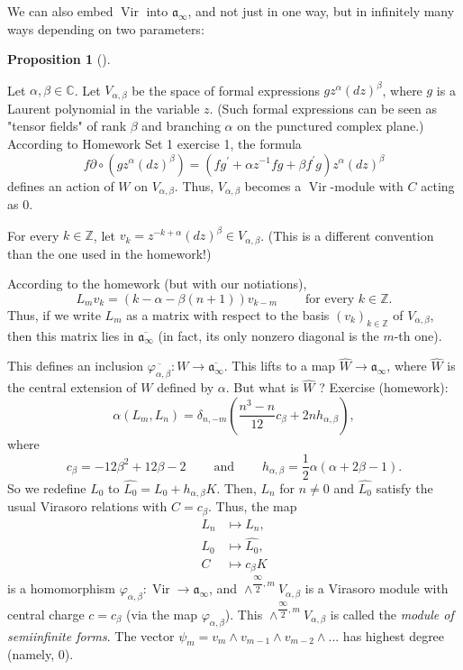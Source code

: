 \documentclass
[numbers=enddot,12pt,final,onecolumn,german,notitlepage]{scrartcl}%
\theoremstyle{definition}
\newtheorem{prop}[theo]{Proposition}
\newenvironment{proposition}[1][]
{\begin{prop}[#1]\begin{leftbar}}
{\end{leftbar}\end{prop}}
\begin{document}
We can also embed $\operatorname*{Vir}$ into $\mathfrak{a}_{\infty}$, and not
just in one way, but in infinitely many ways depending on two parameters:

\begin{proposition}
Let $\alpha,\beta\in\mathbb{C}$. Let $V_{\alpha,\beta}$ be the space of formal
expressions $gz^{\alpha}\left(  dz\right)  ^{\beta}$, where $g$ is a Laurent
polynomial in the variable $z$. (Such formal expressions can be seen as
"tensor fields" of rank $\beta$ and branching $\alpha$ on the punctured
complex plane.) According to Homework Set 1 exercise 1, the formula
\begin{equation}
f\partial\circ\left(  gz^{\alpha}\left(  dz\right)  ^{\beta}\right)  =\left(
fg^{\prime}+\alpha z^{-1}fg+\beta f^{\prime}g\right)  z^{\alpha}\left(
dz\right)  ^{\beta} \label{ex1.1.1}%
\end{equation}
defines an action of $W$ on $V_{\alpha,\beta}$. Thus, $V_{\alpha,\beta}$
becomes a $\operatorname*{Vir}$-module with $C$ acting as $0$.

For every $k\in\mathbb{Z}$, let $v_{k}=z^{-k+\alpha}\left(  dz\right)
^{\beta}\in V_{\alpha,\beta}$. (This is a different convention than the one
used in the homework!)

According to the homework (but with our notiations),%
\[
L_{m}v_{k}=\left(  k-\alpha-\beta\left(  n+1\right)  \right)  v_{k-m}%
\ \ \ \ \ \ \ \ \ \ \text{for every }k\in\mathbb{Z}.
\]
Thus, if we write $L_{m}$ as a matrix with respect to the basis $\left(
v_{k}\right)  _{k\in\mathbb{Z}}$ of $V_{\alpha,\beta}$, then this matrix lies
in $\overline{\mathfrak{a}_{\infty}}$ (in fact, its only nonzero diagonal is
the $m$-th one).

This defines an inclusion $\overline{\varphi_{\alpha,\beta}}:W\rightarrow
\overline{\mathfrak{a}_{\infty}}$. This lifts to a map $\widehat{W}%
\rightarrow\mathfrak{a}_{\infty}$, where $\widehat{W}$ is the central
extension of $W$ defined by $\alpha$. But what is $\widehat{W}$ ? Exercise
(homework):%
\[
\alpha\left(  L_{m},L_{n}\right)  =\delta_{n,-m}\left(  \dfrac{n^{3}-n}%
{12}c_{\beta}+2nh_{\alpha,\beta}\right)  ,
\]
where
\[
c_{\beta}=-12\beta^{2}+12\beta-2\ \ \ \ \ \ \ \ \ \ \text{and}%
\ \ \ \ \ \ \ \ \ \ h_{\alpha,\beta}=\dfrac{1}{2}\alpha\left(  \alpha
+2\beta-1\right)  .
\]
So we redefine $L_{0}$ to $\widehat{L_{0}}=L_{0}+h_{\alpha,\beta}K$. Then,
$L_{n}$ for $n\neq0$ and $\widehat{L_{0}}$ satisfy the usual Virasoro
relations with $C=c_{\beta}$. Thus, the map%
\begin{align*}
L_{n}  &  \mapsto L_{n},\\
L_{0}  &  \mapsto\widehat{L_{0}},\\
C  &  \mapsto c_{\beta}K
\end{align*}
is a homomorphism $\varphi_{\alpha,\beta}:\operatorname*{Vir}\rightarrow
\mathfrak{a}_{\infty}$, and $\wedge^{\dfrac{\infty}{2},m}V_{\alpha,\beta}$ is
a Virasoro module with central charge $c=c_{\beta}$ (via the map
$\varphi_{\alpha,\beta}$). This $\wedge^{\dfrac{\infty}{2},m}V_{\alpha,\beta}$
is called the \textit{module of semiinfinite forms}. The vector $\psi
_{m}=v_{m}\wedge v_{m-1}\wedge v_{m-2}\wedge...$ has highest degree (namely,
$0$).


\end{proposition}
\end{document}
